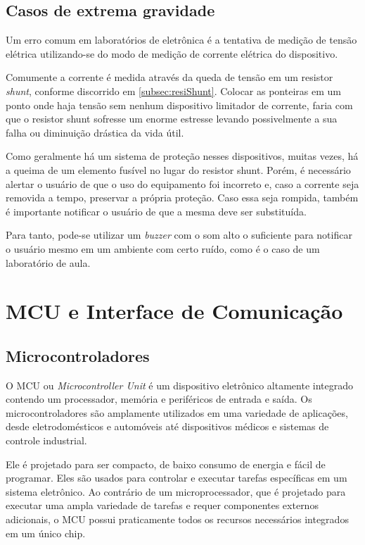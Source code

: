 \subsection{Casos de extrema gravidade} \label{subsec:casosextrgraves}

Um erro comum em laboratórios de eletrônica é a tentativa de medição de tensão elétrica utilizando-se do modo de medição de corrente elétrica do dispositivo. 

Comumente a corrente é medida através da queda de tensão em um resistor \textit{shunt}, conforme discorrido em \ref{subsec:resiShunt}. Colocar as ponteiras em um ponto onde haja tensão sem nenhum dispositivo limitador de corrente, faria com que o resistor shunt sofresse um enorme estresse levando possivelmente a sua falha ou diminuição drástica da vida útil.

Como geralmente há um sistema de proteção nesses dispositivos, muitas vezes, há a queima de um elemento fusível no lugar do resistor shunt. Porém, é necessário alertar o usuário de que o uso do equipamento foi incorreto e, caso a corrente seja removida a tempo, preservar a própria proteção. Caso essa seja rompida, também é importante notificar o usuário de que a mesma deve ser substituída.

Para tanto, pode-se utilizar um \textit{buzzer} com o som alto o suficiente para notificar o usuário mesmo em um ambiente com certo ruído, como é o caso de um laboratório de aula. 

\section{MCU e Interface de Comunicação}\label{sec:MCUInterface}

\subsection{Microcontroladores}\label{subsec:MCU}

O \gls{MCU} ou \textit{Microcontroller Unit} é um dispositivo eletrônico altamente integrado contendo um processador, memória e periféricos de entrada e saída. Os microcontroladores são amplamente utilizados em uma variedade de aplicações, desde eletrodomésticos e automóveis até dispositivos médicos e sistemas de controle industrial.

Ele é projetado para ser compacto, de baixo consumo de energia e fácil de programar. Eles são usados para controlar e executar tarefas específicas em um sistema eletrônico. Ao contrário de um microprocessador, que é projetado para executar uma ampla variedade de tarefas e requer componentes externos adicionais, o \gls{MCU} possui praticamente todos os recursos necessários integrados em um único chip.

